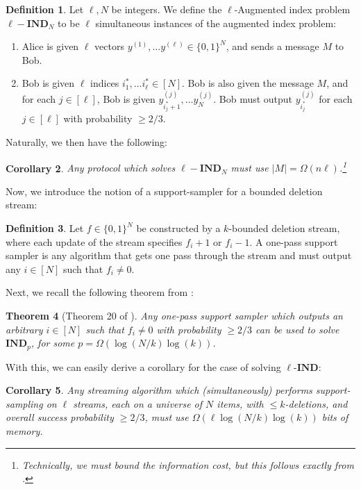 \documentclass[11pt]{article}
\newtheorem{theorem}{Theorem}[section]
\newtheorem{corollary}[theorem]{Corollary}
\theoremstyle{definition}
\newtheorem{definition}[theorem]{Definition}
\newcommand{\zo}{\{0, 1\}}
\begin{document}
\begin{definition}
    Let $\ell, N$ be integers. We define the $\ell$-Augmented index problem $\ell-\textbf{IND}_N$ to be $\ell$ simultaneous instances of the augmented index problem:
    \begin{enumerate}
        \item Alice is given $\ell$ vectors $y^{(1)}, \dots y^{(\ell)} \in \zo^N$, and sends a message $M$ to Bob.
    \item Bob is given $\ell$ indices $i_1^*, \dots i_{\ell}^* \in [N]$. Bob is also given the message $M$, and for each $j \in [\ell]$, Bob is given $y^{(j)}_{i_j^* + 1}, \dots y^{(j)}_N$. Bob must output $y^{(j)}_{i_{j}^*}$ for each $j \in [\ell]$ with probability $\geq 2/3$. 
    \end{enumerate}
\end{definition}

Naturally, we then have the following:

\begin{corollary}\label{cor:LBManyAugIndex}
    Any protocol which solves $\ell-\textbf{IND}_N$ must use $|M| = \Omega(n\ell)$.\footnote{Technically, we must bound the information cost, but this follows exactly from \cite{CK11}.}
\end{corollary}

Now, we introduce the notion of a support-sampler for a bounded deletion stream:

\begin{definition}
    Let $f \in \zo^N$ be constructed by a $k$-bounded deletion stream, where each update of the stream specifies $f_i + 1$ or $f_i - 1$. A one-pass support sampler is any algorithm that gets one pass through the stream and must output any $i \in [N]$ such that $f_i \neq 0$.
\end{definition}

Next, we recall the following theorem from \cite{JW18}:

\begin{theorem}[Theorem 20 of \cite{JW18}]\label{thm:JW18LB}
    Any one-pass support sampler which outputs an arbitrary $i \in [N]$ such that $f_i \neq 0$ with probability $\geq 2/3$ can be used to solve $\textbf{IND}_{p}$, for some $p = \Omega(\log(N/k)\log(k))$.
\end{theorem}

With this, we can easily derive a corollary for the case of solving $\ell$-$\textbf{IND}$:

\begin{corollary}
    Any streaming algorithm which (simultaneously) performs support-sampling on $\ell$ streams, each on a universe of $N$ items, with $\leq k$-deletions, and overall success probability $\geq 2/3$, must use $\Omega(\ell \log(N/k)\log(k))$ bits of memory.
\end{corollary}
\end{document}

